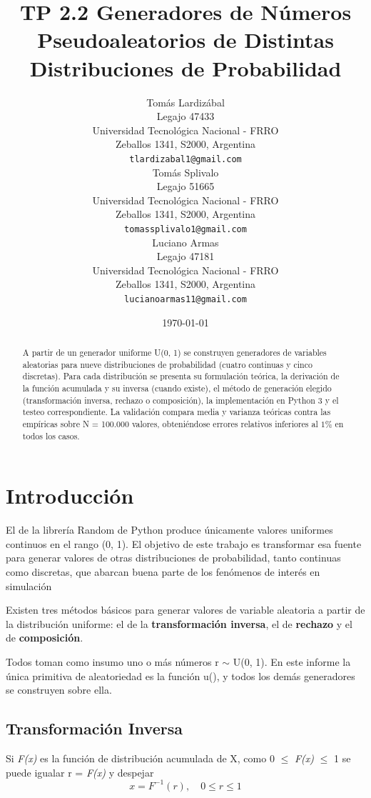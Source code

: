 \documentclass{article}
\title{TP 2.2 Generadores de Números Pseudoaleatorios de Distintas Distribuciones de Probabilidad}
\author{
 Tomás Lardizábal \\
  Legajo 47433\\
  Universidad Tecnológica Nacional - FRRO\\
  Zeballos 1341, S2000, Argentina \\
  \texttt{tlardizabal1@gmail.com} \\
   \And
 Tomás Splivalo\\
  Legajo 51665 \\
  Universidad Tecnológica Nacional - FRRO\\
  Zeballos 1341, S2000, Argentina \\
  \texttt{tomassplivalo1@gmail.com} \\
    \And
 Luciano Armas\\
  Legajo 47181\\
  Universidad Tecnológica Nacional - FRRO\\
  Zeballos 1341, S2000, Argentina \\
  \texttt{lucianoarmas11@gmail.com} \\
}
\date{\today}
\begin{document}
\maketitle

\pagestyle{fancy}
\fancyhead{} %

\begin{abstract}
A partir de un generador uniforme U(0, 1) se construyen generadores de variables aleatorias para nueve distribuciones de probabilidad (cuatro continuas y cinco discretas). Para cada distribución se presenta su formulación teórica, la derivación de la función acumulada y su inversa (cuando existe), el método de generación elegido (transformación inversa, rechazo o composición), la implementación en Python 3 y el testeo correspondiente. 
La validación compara media y varianza teóricas contra las empíricas sobre N = 100.000 valores, obteniéndose errores relativos inferiores al \(1\%\) en todos los casos.
\end{abstract}


\section{Introducción}
El de la librería Random de Python produce únicamente valores uniformes continuos en el rango (0, 1). El objetivo de este trabajo es transformar esa fuente para generar valores de otras distribuciones de probabilidad, tanto continuas como discretas, que abarcan buena parte de los fenómenos de interés en simulación

Existen tres métodos básicos para generar valores de variable aleatoria a partir de la distribución uniforme: el de la \textbf{transformación inversa}, el de \textbf{rechazo} y el de \textbf{composición}. 

Todos toman como insumo uno o más números r $\sim$ U(0, 1). En este informe la única primitiva de aleatoriedad es la función u(), y todos los demás generadores se construyen sobre ella.


\subsection{Transformación Inversa}
Si \textit{F(x)} es la función de distribución acumulada de X, como 0 $\leq$ \textit{F(x)} $\leq$ 1 se puede igualar r = \textit{F(x)} y despejar
\begin{equation}
x = F^{-1}(r),   \quad  0 \leq r \leq 1
\end{equation}
\end{document}
